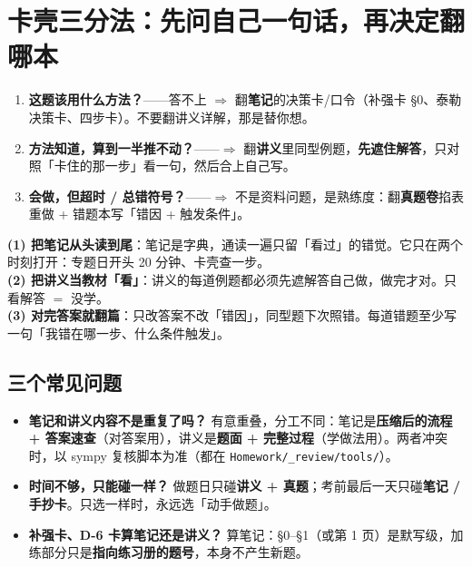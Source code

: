 \documentclass[11pt,a4paper]{ctexart}
\begin{document}
\section{卡壳三分法：先问自己一句话，再决定翻哪本}

\begin{methodbox}
\begin{enumerate}[label=\textbf{问 \arabic*.}]
  \item \textbf{这题该用什么方法？}——答不上 $\Rightarrow$ 翻\textbf{笔记}的决策卡/口令（补强卡 §0、泰勒决策卡、四步卡）。不要翻讲义详解，那是替你想。
  \item \textbf{方法知道，算到一半推不动？}——$\Rightarrow$ 翻\textbf{讲义}里同型例题，\textbf{先遮住解答}，只对照「卡住的那一步」看一句，然后合上自己写。
  \item \textbf{会做，但超时 / 总错符号？}——$\Rightarrow$ 不是资料问题，是熟练度：翻\textbf{真题卷}掐表重做 + 错题本写「错因 + 触发条件」。
\end{enumerate}
\end{methodbox}

\begin{warnbox}
\textbf{(1) 把笔记从头读到尾}：笔记是字典，通读一遍只留「看过」的错觉。它只在两个时刻打开：专题日开头 20 分钟、卡壳查一步。\\
\textbf{(2) 把讲义当教材「看」}：讲义的每道例题都必须先遮解答自己做，做完才对。只看解答 $=$ 没学。\\
\textbf{(3) 对完答案就翻篇}：只改答案不改「错因」，同型题下次照错。每道错题至少写一句「我错在哪一步、什么条件触发」。
\end{warnbox}

\subsection{三个常见问题}

\begin{itemize}
  \item \textbf{笔记和讲义内容不是重复了吗？} 有意重叠，分工不同：笔记是\textbf{压缩后的流程 + 答案速查}（对答案用），讲义是\textbf{题面 + 完整过程}（学做法用）。两者冲突时，以 sympy 复核脚本为准（都在 \texttt{Homework/\_review/tools/}）。
  \item \textbf{时间不够，只能碰一样？} 做题日只碰\textbf{讲义 + 真题}；考前最后一天只碰\textbf{笔记 / 手抄卡}。只选一样时，永远选「动手做题」。
  \item \textbf{补强卡、D-6 卡算笔记还是讲义？} 算笔记：§0--§1（或第 1 页）是默写级，加练部分只是\textbf{指向练习册的题号}，本身不产生新题。
\end{itemize}
\end{document}
